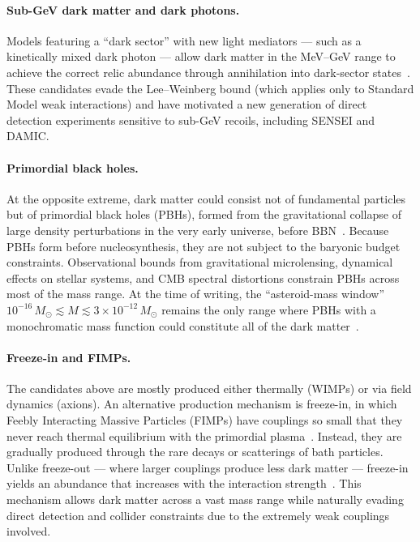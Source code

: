 \paragraph{Sub-GeV dark matter and dark photons.}
Models featuring a ``dark sector'' with new light mediators --- such as a kinetically mixed dark photon --- allow dark matter in the MeV--GeV range to achieve the correct relic abundance through annihilation into dark-sector states~\cite{Cirelli:2024ssz}.
These candidates evade the Lee--Weinberg bound (which applies only to Standard Model weak interactions) and have motivated a new generation of direct detection experiments sensitive to sub-GeV recoils, including SENSEI and DAMIC.

\paragraph{Primordial black holes.}
At the opposite extreme, dark matter could consist not of fundamental particles but of primordial black holes (PBHs), formed from the gravitational collapse of large density perturbations in the very early universe, before BBN~\cite{Cirelli:2024ssz}.
Because PBHs form before nucleosynthesis, they are not subject to the baryonic budget constraints.
Observational bounds from gravitational microlensing, dynamical effects on stellar systems, and CMB spectral distortions constrain PBHs across most of the mass range.
At the time of writing, the ``asteroid-mass window'' $10^{-16}\,M_\odot \lesssim M \lesssim 3 \times 10^{-12}\,M_\odot$ remains the only range where PBHs with a monochromatic mass function could constitute all of the dark matter~\cite{Cirelli:2024ssz}.

\paragraph{Freeze-in and FIMPs.}
The candidates above are mostly produced either thermally (WIMPs) or via field dynamics (axions).
An alternative production mechanism is freeze-in, in which Feebly Interacting Massive Particles (FIMPs) have couplings so small that they never reach thermal equilibrium with the primordial plasma~\cite{Hall:2009bx}.
Instead, they are gradually produced through the rare decays or scatterings of bath particles.
Unlike freeze-out --- where larger couplings produce less dark matter --- freeze-in yields an abundance that increases with the interaction strength~\cite{Cirelli:2024ssz}.
This mechanism allows dark matter across a vast mass range while naturally evading direct detection and collider constraints due to the extremely weak couplings involved.

